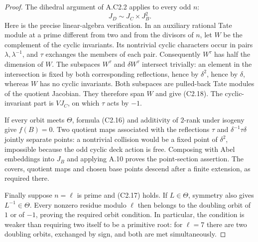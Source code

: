 \begin{proof}
The dihedral argument of A.C2.2 applies to every odd $n$:
\[
                         J_D\sim J_C\times J_B^2.
                                                               \tag{C2.18}
\]
Here is the precise linear-algebra verification. In an auxiliary
rational Tate module at a prime different from two and from the
divisors of $n$, let $W$ be the complement of the cyclic
invariants. Its nontrivial cyclic characters occur in pairs
$\lambda,\lambda^{-1}$, and $\tau$ exchanges the members of
each pair. Consequently $W^\tau$ has half the dimension of $W$.
The subspaces $W^\tau$ and $\delta W^\tau$ intersect trivially:
an element in the intersection is fixed by both corresponding
reflections, hence by $\delta^2$, hence by $\delta$, whereas
$W$ has no cyclic invariants. Both subspaces are pulled-back
Tate modules of the quotient Jacobian. They therefore span $W$
and give (C2.18). The cyclic-invariant part is $VJ_C$, on which
$\tau$ acts by $-1$.

If every orbit meets $\Theta$, formula (C2.16) and additivity
of $2$-rank under isogeny give $f(B)=0$. Two quotient maps
associated with the reflections $\tau$ and
$\delta^{-1}\tau\delta$ jointly separate points: a nontrivial
collision would be a fixed point of $\delta^2$, impossible
because the odd cyclic deck action is free. Composing with
Abel embeddings into $J_B$ and applying A.10 proves the
point-section assertion. The covers, quotient maps and chosen
base points descend after a finite extension, as required there.

Finally suppose $n=\ell$ is prime and (C2.17) holds. If
$L\in\Theta$, symmetry also gives $L^{-1}\in\Theta$.
Every nonzero residue modulo $\ell$ then belongs to the
doubling orbit of $1$ or of $-1$, proving the required
orbit condition. In particular, the condition is weaker than
requiring two itself to be a primitive root: for $\ell=7$
there are two doubling orbits, exchanged by sign, and both
are met simultaneously.
\end{proof}

